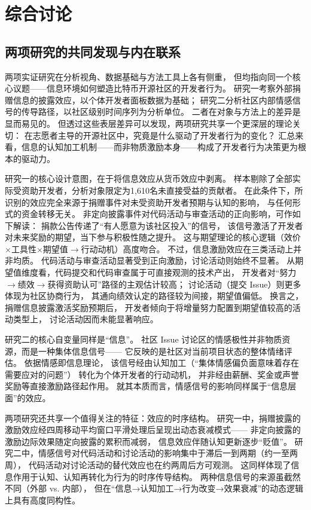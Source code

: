 \chapter{综合讨论}

\section{两项研究的共同发现与内在联系}

两项实证研究在分析视角、数据基础与方法工具上各有侧重，
但均指向同一个核心议题——信息环境如何塑造比特币开源社区的开发者行为。
研究一考察外部捐赠信息的披露效应，以个体开发者面板数据为基础；
研究二分析社区内部情感信号的传导路径，以社区级别时间序列为分析单位。
二者在对象与方法上的差异是显而易见的。
但透过这些表层差异可以发现，两项研究共享一个更深层的理论关切：
在志愿者主导的开源社区中，究竟是什么驱动了开发者行为的变化？
汇总来看，信息的认知加工机制——而非物质激励本身——构成了开发者行为决策更为根本的驱动力。

研究一的核心设计意图，在于将信息效应从货币效应中剥离。
样本剔除了全部实际受资助开发者，分析对象限定为1,610名未直接受益的贡献者。
在此条件下，所识别的效应完全来源于捐赠事件对未受资助开发者预期与认知的影响，
与任何形式的资金转移无关。
非定向披露事件对代码活动与审查活动的正向影响，可作如下解读：
捐款公告传递了“有人愿意为该社区投入”的信号，
该信号激活了开发者对未来奖励的期望，当下参与积极性随之提升。
这与期望理论\cite{vroom1964work}的核心逻辑（效价$\times$工具性$\times$期望值$\to$行动动机）高度吻合。
不过，信息激励效应在三类活动上并非均质。
代码活动与审查活动显著受到正向激励，讨论活动则始终不显著。
从期望值维度看，代码提交和代码审查属于可直接观测的技术产出，
开发者对“努力$\to$绩效$\to$获得资助认可”路径的主观估计较高；
讨论活动（提交 Issue）则更多体现为社区协商行为，
其通向绩效认定的路径较为间接，期望值偏低。
换言之，捐赠信息披露激活奖励预期后，
开发者倾向于将增量努力配置到期望值较高的活动类型上，
讨论活动因而未能显著响应。

研究二的核心自变量同样是“信息”。
社区 Issue 讨论区的情感极性并非物质资源，而是一种集体信息信号——
它反映的是社区对当前项目状态的整体情绪评估。
依据情感即信息理论\cite{schwarz1983moods}，
该信号经由认知加工（“集体情感偏负面意味着存在需要应对的问题”）
转化为个体开发者的行动动机，
并非经由薪酬、奖金或声誉奖励等直接激励路径起作用。
就其本质而言，情感信号的影响同样属于“信息层面”的效应。

两项研究还共享一个值得关注的特征：效应的时序结构。
研究一中，捐赠披露的激励效应经四周移动平均窗口平滑处理后呈现出动态衰减模式——
非定向披露的激励边际效果随定向披露的累积而减弱，
信息效应伴随认知更新逐步“贬值”。
研究二中，情感信号对代码活动和讨论活动的影响集中于滞后一到两期（约一至两周），
代码活动对讨论活动的替代效应也在约两周后方可观测。
这同样体现了信息作用于认知、认知再转化为行为的时序传导结构。
两种信息信号的来源虽截然不同（外部 vs. 内部），
但在“信息→认知加工→行为改变→效果衰减”的动态逻辑上具有高度同构性。

